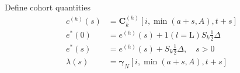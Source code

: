 \documentclass{article}
\begin{document}
Define cohort quantities
\begin{align}
  c^{(h)}(s) & = \bm{C}_k^{(h)}[i, \min(a + s, A), t + s] \\
  e^*(0) & = e^{(h)}(s) + 1(l = \text{L}) S_k \tfrac{1}{2} \Delta \\
  e^*(s) & = e^{(h)}(s) + S_k \tfrac{1}{2} \Delta, \quad s > 0 \\
  \lambda(s) & = \bm{\gamma}_N[i, \min(a + s, A), t + s]
\end{align}





 







\end{document}
